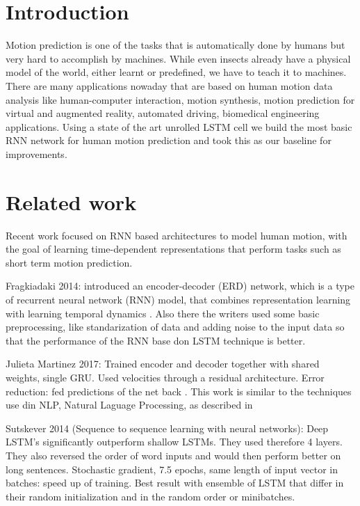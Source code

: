 

\section{Introduction}

Motion prediction is one of the tasks that is automatically done by humans but very hard to accomplish by machines. While even insects already have a physical model of the world, either learnt or predefined, we have to teach it to machines. There are many applications nowaday that are based on human motion data analysis like human-computer interaction, motion synthesis, motion prediction for virtual and augmented reality, automated driving, biomedical engineering applications.
Using a state of the art unrolled LSTM cell we build the most basic RNN network for human motion prediction and took this as our baseline for improvements. 

\section{Related work}
Recent work focused on RNN based architectures to model human motion, with the goal of learning time-dependent representations that perform tasks such as short term motion prediction. 

Fragkiadaki 2014: introduced an encoder-decoder (ERD) network, which is a type of recurrent neural network (RNN) model, that combines representation learning with learning temporal dynamics \cite{Fragkiadaki2014}. Also there the writers used some basic preprocessing, like standarization of data and adding noise to the input data so that the performance of the RNN base don LSTM technique is better.

Julieta Martinez 2017: Trained encoder and decoder together with shared weights, single GRU. Used velocities through a residual architecture. Error reduction: fed predictions of the net back \cite{Martinez2017}. This work is similar to the techniques use din NLP, Natural Laguage Processing, as described in \cite{Sutskever2014}

Sutskever 2014 (Sequence to sequence learning with neural networks): Deep LSTM's significantly outperform shallow LSTMs. They used therefore 4 layers. They also reversed the order of word inputs and would then perform better on long sentences. Stochastic gradient, 7.5 epochs, same length of input vector in batches: speed up of training. Best result with ensemble of LSTM that differ in their random initialization and in the random order or minibatches. \cite{Sutskever2014}\\

